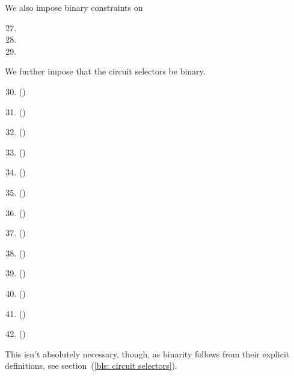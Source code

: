 \noindent We also impose binary constraints on
\begin{multicols}{2}
    \begin{enumerate}
        \setcounter{enumi}{26}
        \item \isFirstInput
        \item \isSecondInput
        \item \wcpFlag
    \end{enumerate} 
\end{multicols}
\noindent We further impose that the circuit selectors be binary.
\begin{multicols}{2}
    \begin{enumerate}
        \setcounter{enumi}{29}
    \item \csPointEvaluation{}        (\sanityCheck)
    \item \csPointEvaluationFailure{} (\sanityCheck)
    \item \csCOne{}                   (\sanityCheck)
    \item \csGOne{}                   (\sanityCheck)
    \item \csCTwo{}                   (\sanityCheck)
    \item \csGTwo{}                   (\sanityCheck)
    \item \csPairing{}                (\sanityCheck)
    \item \csGOneAdd{}                (\sanityCheck)
    \item \csGTwoAdd{}                (\sanityCheck)
    \item \csGOneMsm{}                (\sanityCheck)
    \item \csGTwoMsm{}                (\sanityCheck)
    \item \csMapFpToGOne{}            (\sanityCheck)
    \item \csMapFpTwoToGTwo{}         (\sanityCheck)
    \end{enumerate}
\end{multicols}
\saNote{}
This isn't absolutely necessary,
though, as binarity follows from their explicit definitions,
see section~(\ref{bls: circuit selectors}).
